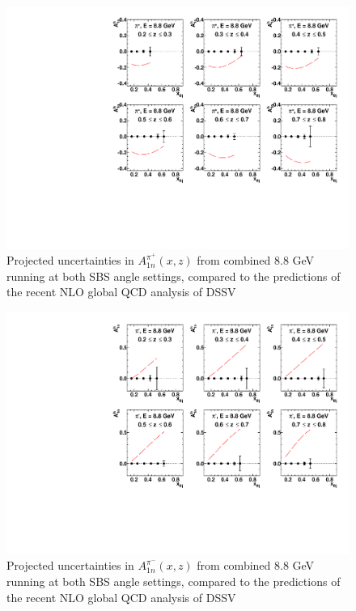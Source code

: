 \begin{figure}[h]
  \begin{center}
    \includegraphics[width=.75\textwidth]{figures/A1n_vs_x_E88_pip.pdf}
  \end{center}
  \caption{\label{A1n_pip_88gev} Projected uncertainties in $A_{1n}^{\pi^+}(x,z)$ from combined 8.8 GeV running at both SBS angle settings, compared to the predictions of the recent NLO global QCD analysis of DSSV~\cite{DSSVplus}}
\end{figure}
\begin{figure}[h]
  \begin{center}
    \includegraphics[width=.75\textwidth]{figures/A1n_vs_x_E88_pim.pdf}
  \end{center}
  \caption{\label{A1n_pim_88gev} Projected uncertainties in $A_{1n}^{\pi^-}(x,z)$ from combined 8.8 GeV running at both SBS angle settings, compared to the predictions of the recent NLO global QCD analysis of DSSV~\cite{DSSVplus}}
\end{figure}
